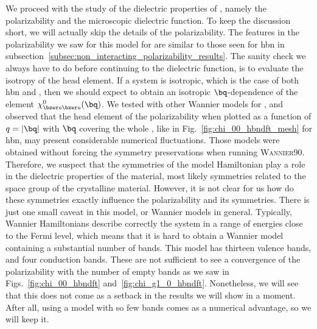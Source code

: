 We proceed with the study of the dielectric properties of , namely the polarizability and the microscopic dielectric function.
To keep the discussion short, we will actually skip the details of the polarizability.
The features in the polarizability we saw for this model for  are similar to those seen for \gls{hbn} in subsection~\ref{subsec:non_interacting_polarizability_results}.
The sanity check we always have to do before continuing to the dielectric function, is to evaluate the isotropy of the head element.
If a system is isotropic, which is the case of both \gls{hbn} and , then we should expect to obtain an isotropic $\bq$-dependence of the element $\chi^0_{\bzero \bzero}(\bq)$.
We tested with other Wannier models for , and observed that the head element of the polarizability when plotted as a function of $q=|\bq|$ with $\bq$ covering the whole \bz, like in Fig.~\ref{fig:chi_00_hbndft_mesh} for \gls{hbn}, may present considerable numerical fluctuations.
Those models were obtained without forcing the symmetry preservations when running \textsc{Wannier90}.
Therefore, we suspect that the symmetries of the model Hamiltonian play a role in the dielectric properties of the material, most likely symmetries related to the space group of the crystalline material.
However, it is not clear for us how do these symmetries exactly influence the polarizability and its symmetries.
There is just one small caveat in this model, or Wannier models in general.
Typically, Wannier Hamiltonians describe correctly the system in a range of energies close to the Fermi level, which means that it is hard to obtain a Wannier model containing a substantial number of bands.
This model has thirteen valence bands, and four conduction bands.
These are not sufficient to see a convergence of the polarizability with the number of empty bands as we saw in Figs.~\ref{fig:chi_00_hbndft} and~\ref{fig:chi_g1_0_hbndft}.
Nonetheless, we will see that this does not come as a setback in the results we will show in a moment.
After all, using a model with so few bands comes as a numerical advantage, so we will keep it.

